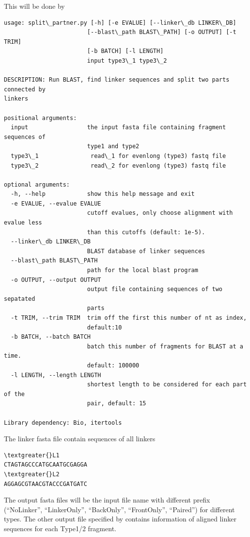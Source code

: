 \documentclass[letterpaper,10pt,english]{sphinxmanual}
\begin{document}
This will be done by 

\begin{Verbatim}[commandchars=\\\{\}]
usage: split\_partner.py [-h] [-e EVALUE] [--linker\_db LINKER\_DB]
                        [--blast\_path BLAST\_PATH] [-o OUTPUT] [-t TRIM]
                        [-b BATCH] [-l LENGTH]
                        input type3\_1 type3\_2

DESCRIPTION: Run BLAST, find linker sequences and split two parts connected by
linkers

positional arguments:
  input                 the input fasta file containing fragment sequences of
                        type1 and type2
  type3\_1               read\_1 for evenlong (type3) fastq file
  type3\_2               read\_2 for evenlong (type3) fastq file

optional arguments:
  -h, --help            show this help message and exit
  -e EVALUE, --evalue EVALUE
                        cutoff evalues, only choose alignment with evalue less
                        than this cutoffs (default: 1e-5).
  --linker\_db LINKER\_DB
                        BLAST database of linker sequences
  --blast\_path BLAST\_PATH
                        path for the local blast program
  -o OUTPUT, --output OUTPUT
                        output file containing sequences of two sepatated
                        parts
  -t TRIM, --trim TRIM  trim off the first this number of nt as index,
                        default:10
  -b BATCH, --batch BATCH
                        batch this number of fragments for BLAST at a time.
                        default: 100000
  -l LENGTH, --length LENGTH
                        shortest length to be considered for each part of the
                        pair, default: 15

Library dependency: Bio, itertools
\end{Verbatim}

The linker fasta file contain sequences of all linkers

\begin{Verbatim}[commandchars=\\\{\}]
\textgreater{}L1
CTAGTAGCCCATGCAATGCGAGGA
\textgreater{}L2
AGGAGCGTAACGTACCCGATGATC
\end{Verbatim}

The output fasta files will be the input file name with different prefix (``NoLinker'', ``LinkerOnly'', ``BackOnly'', ``FrontOnly'', ``Paired'') for different types. The other output file specified by  contains information of aligned linker sequences for each Type1/2 fragment.
\end{document}
